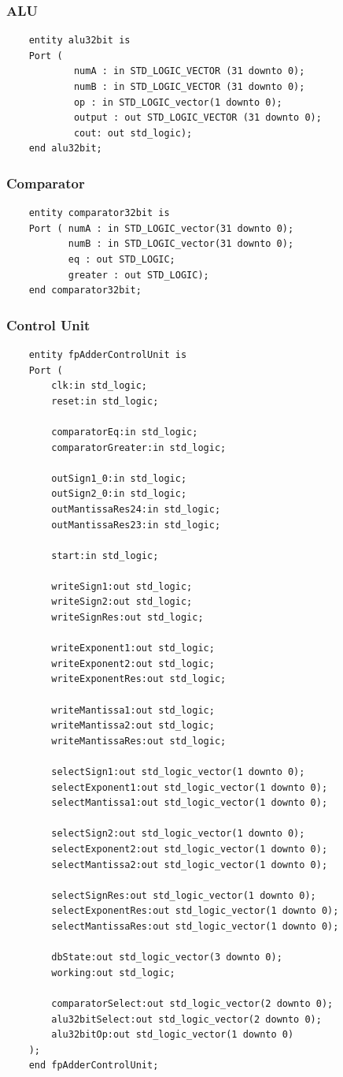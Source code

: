 \documentclass[a4paper,10pt]{article}
\begin{document}
    \subsubsection{ALU}
    \begin{lstlisting}
    entity alu32bit is
    Port (
            numA : in STD_LOGIC_VECTOR (31 downto 0);
            numB : in STD_LOGIC_VECTOR (31 downto 0);
            op : in STD_LOGIC_vector(1 downto 0);
            output : out STD_LOGIC_VECTOR (31 downto 0);
            cout: out std_logic);
    end alu32bit;
    \end{lstlisting}

    \subsubsection{Comparator}
    \begin{lstlisting}
    entity comparator32bit is
    Port ( numA : in STD_LOGIC_vector(31 downto 0);
           numB : in STD_LOGIC_vector(31 downto 0);
           eq : out STD_LOGIC;
           greater : out STD_LOGIC);
    end comparator32bit;
    \end{lstlisting}

    \subsubsection{Control Unit}
    \begin{lstlisting}
    entity fpAdderControlUnit is
	Port (
		clk:in std_logic;
		reset:in std_logic;

		comparatorEq:in std_logic;
		comparatorGreater:in std_logic;

		outSign1_0:in std_logic;
		outSign2_0:in std_logic;
		outMantissaRes24:in std_logic;
		outMantissaRes23:in std_logic;

		start:in std_logic;

		writeSign1:out std_logic;
		writeSign2:out std_logic;
		writeSignRes:out std_logic;

		writeExponent1:out std_logic;
		writeExponent2:out std_logic;
		writeExponentRes:out std_logic;

		writeMantissa1:out std_logic;
		writeMantissa2:out std_logic;
		writeMantissaRes:out std_logic;

		selectSign1:out std_logic_vector(1 downto 0);
		selectExponent1:out std_logic_vector(1 downto 0);
		selectMantissa1:out std_logic_vector(1 downto 0);

		selectSign2:out std_logic_vector(1 downto 0);
		selectExponent2:out std_logic_vector(1 downto 0);
		selectMantissa2:out std_logic_vector(1 downto 0);

		selectSignRes:out std_logic_vector(1 downto 0);
		selectExponentRes:out std_logic_vector(1 downto 0);
		selectMantissaRes:out std_logic_vector(1 downto 0);

		dbState:out std_logic_vector(3 downto 0);
		working:out std_logic;

		comparatorSelect:out std_logic_vector(2 downto 0);
		alu32bitSelect:out std_logic_vector(2 downto 0);
		alu32bitOp:out std_logic_vector(1 downto 0)
	);
    end fpAdderControlUnit;
    \end{lstlisting}
\end{document}
